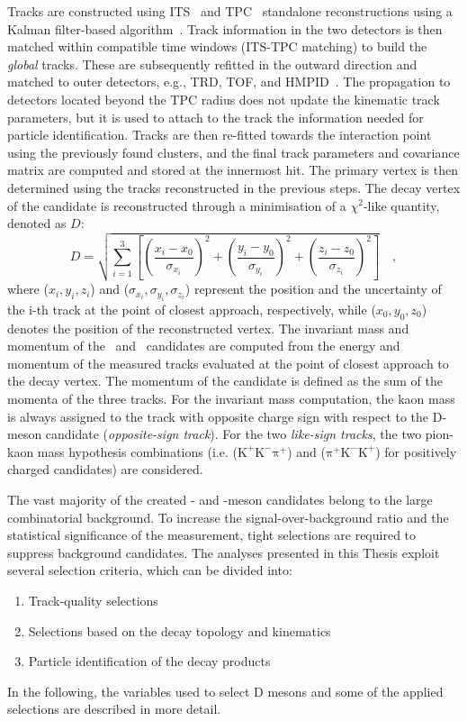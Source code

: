 Tracks are constructed using ITS~\cite{Concas:2878385} and TPC~\cite{Rohr:2018cxc} standalone reconstructions using a Kalman filter-based algorithm~\cite{Fruhwirth:1987fm}. Track information in the two detectors is then matched within compatible time windows (ITS-TPC matching) to build the \emph{global} tracks. These are subsequently refitted in the outward direction and matched to outer detectors, e.g., TRD, TOF, and HMPID~\cite{Rohr:2019ava}. The propagation to detectors located beyond the TPC radius does not update the kinematic track parameters, but it is used to attach to the track the information needed for particle identification. Tracks are then re-fitted towards the interaction point using the previously found clusters, and the final track parameters and covariance matrix are computed and stored at the innermost hit. The primary vertex is then determined using the tracks reconstructed in the previous steps.
The decay vertex of the candidate is reconstructed through a minimisation of a $\chi^2$-like quantity, denoted as $D$:
\begin{equation*}
    D = \sqrt{\sum_{i=1}^3 \left[\left(\frac{x_i-x_0}{\sigma_{x_i}}\right)^2 + \left(\frac{y_i-y_0}{\sigma_{y_i}}\right)^2 +\left(\frac{z_i-z_0}{\sigma_{z_i}}\right)^2\right]}\quad ,
\end{equation*}
where ($x_i,y_i,z_i$) and ($\sigma_{x_i},\sigma_{y_i},\sigma_{z_i}$) represent the position and the uncertainty of the i-th track at the point of closest approach, respectively, while ($x_0,y_0,z_0$) denotes the position of the reconstructed vertex. The invariant mass and momentum of the \ds\ and \dpl\ candidates are computed from the energy and momentum of the measured tracks evaluated at the point of closest approach to the decay vertex. The momentum of the candidate is defined as the sum of the momenta of the three tracks. For the invariant mass computation, the kaon mass is always assigned to the track with opposite charge sign with respect to the D-meson candidate (\emph{opposite-sign track}). For the two \emph{like-sign tracks}, the two pion-kaon mass hypothesis combinations \big(i.e. ($\mathrm{K^+K^-\pi^+}$) and ($\mathrm{\pi^+K^-K^+}$) for positively charged candidates\big) are considered. 

The vast majority of the created \ds- and \dpl-meson candidates belong to the large combinatorial background. To increase the signal-over-background ratio and the statistical significance of the measurement, tight selections are required to suppress background candidates. The analyses presented in this Thesis exploit several selection criteria, which can be divided into:
\begin{enumerate}[i]
    \item Track-quality selections
    \item Selections based on the decay topology and kinematics
    \item Particle identification of the decay products
\end{enumerate}
In the following, the variables used to select D mesons and some of the applied selections are described in more detail.

